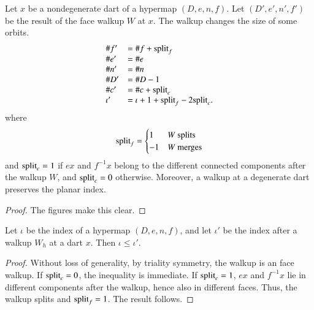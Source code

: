 \begin{lemma} Let $x$ be a nondegenerate dart of a hypermap $(D,e,n,f)$. Let $(D',e',n',f')$ be the result of the face walkup $W$ at $x$.  
The walkup changes the size of some orbits.
    $$
    \begin{array}{lll}
    \# f' &=\# f +{\operatorname{split}}_f  \\  
    \# e'&=\# e \\
    \# n'&=\# n \\
    \# D'&=\# D - 1 \\
    \#c'&=\# c + {\operatorname{split}}_c\\
    \iota' &= \iota + 1+{\operatorname{split}}_f - 2{\operatorname{split}}_c.\\
    \end{array}
    $$
where
   $$
   {\operatorname{split}}_f = \begin{cases}
     1 & W \text{ splits }\\
    -1 & W \text{ merges}\\
   \end{cases}
   $$
and ${\operatorname{split}}_c=1$ if $e x$ and $f^{-1} x$ belong to the different connected components after the walkup $W$, and ${\operatorname{split}}_c=0$ otherwise. Moreover, a walkup at a degenerate dart preserves the planar index.
\end{lemma}

\begin{proof} The figures make this clear.
\end{proof}

\begin{lemma}
Let $\iota$ be the index of a  hypermap $(D,e,n,f)$, and let $\iota'$ be the index after a walkup $W_h$ at a dart $x$.  Then $\iota \le \iota'$.
\end{lemma} 


\begin{proof}  Without loss of generality, by triality symmetry,  the walkup is an face walkup.  If ${\operatorname{split}}_c=0$, the inequality is immediate.  If ${\operatorname{split}}_c=1$, 
$e x$ and $f^{-1} x$ lie in different components after the walkup, hence also in different faces.  Thus, the walkup splits and ${\operatorname{split}}_f = 1$.  The result follows.
\end{proof}


